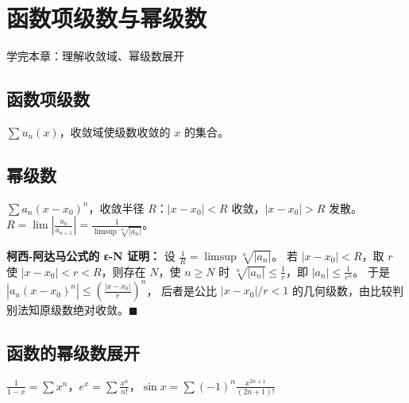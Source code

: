 \chapter{函数项级数与幂级数}
\begin{applicationbox}
学完本章：理解收敛域、幂级数展开
\end{applicationbox}
\section{函数项级数} \(\sum u_n(x)\)，收敛域使级数收敛的 \(x\) 的集合。
\section{幂级数} \(\sum a_n(x-x_0)^n\)，收敛半径 \(R\)：\(|x-x_0|<R\) 收敛，\(|x-x_0|>R\) 发散。
\(R = \lim \left|\frac{a_n}{a_{n+1}}\right| = \frac{1}{\limsup\sqrt[n]{|a_n|}}\)。

\textbf{柯西-阿达马公式的 ε-N 证明：} 设 \(\frac1R=\limsup\sqrt[n]{|a_n|}\)。
若 \(|x-x_0|<R\)，取 \(r\) 使 \(|x-x_0|<r<R\)，则存在 \(N\)，使 \(n\ge N\) 时
\(\sqrt[n]{|a_n|}\le\frac1r\)，即 \(|a_n|\le\frac1{r^n}\)。
于是 \(|a_n(x-x_0)^n|\le\left(\frac{|x-x_0|}{r}\right)^n\)，
后者是公比 \(|x-x_0|/r<1\) 的几何级数，由比较判别法知原级数绝对收敛。\(\blacksquare\)
\section{函数的幂级数展开} \(\frac1{1-x}=\sum x^n\)，\(e^x=\sum\frac{x^n}{n!}\)，\(\sin x=\sum(-1)^n\frac{x^{2n+1}}{(2n+1)!}\)
